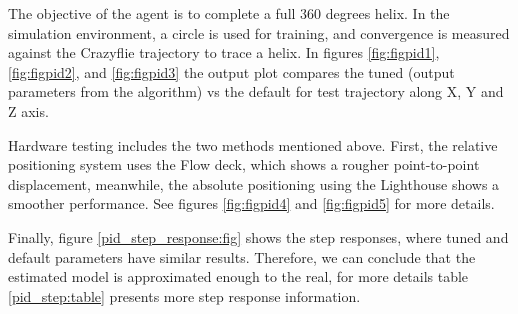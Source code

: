 \documentclass[../templateLTHtwocol.tex]{subfiles}
\begin{document}
The objective of the agent is to complete a full 360 degrees helix. In the simulation environment, a circle is used for training, and convergence is measured against the Crazyflie trajectory to trace a helix. In figures \ref{fig:figpid1}, \ref{fig:figpid2}, and \ref{fig:figpid3} the output plot compares the tuned (output parameters from the algorithm) vs the default for test trajectory along X, Y and Z axis.

Hardware testing includes the two methods mentioned above. First, the relative positioning system uses the Flow deck, which shows a rougher point-to-point displacement, meanwhile, the absolute positioning using the Lighthouse shows a smoother performance. See figures \ref{fig:figpid4} and \ref{fig:figpid5} for more details.

Finally, figure \ref{pid_step_response:fig} shows the step responses, where tuned and default parameters have similar results. Therefore, we can conclude that the estimated model is approximated enough to the real, for more details table \ref{pid_step:table} presents more step response information. 
\end{document}
